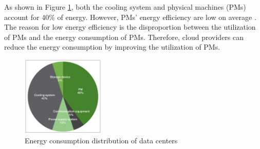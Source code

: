  As shown in Figure \ref{fig:consumption}, both the cooling system and physical machines (PMs) account for 40\% of energy. However, PMs' energy efficiency are low on average  \cite{Hameed:2016cmb}.
The reason for low energy efficiency is the disproportion between the utilization of PMs and the energy consumption of PMs.  Therefore, 
cloud providers can reduce the energy consumption by improving the utilization of PMs.



\begin{figure}
	\centering
		\includegraphics[width=0.35\textwidth]{pics/energyConsumption.png}
		\caption{Energy consumption distribution of data centers \cite{Rong:2016js}}
		\label{fig:consumption}
\end{figure} 

